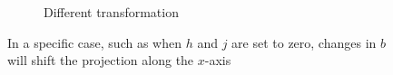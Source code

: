 \documentclass[11pt]{extarticle}
\begin{document}
\begin{figure}[!ht]
\begin{subfigure}{.3\textwidth}
            \caption{Different transformation}
        \end{subfigure}
        \caption{In a specific case, such as when $h$ and $j$ are set to zero, changes in $b$ will shift the projection along the $x$-axis}
    \end{figure}
\end{document}
